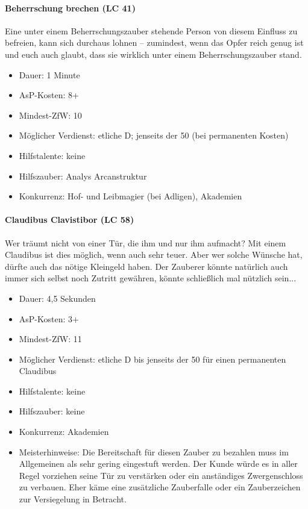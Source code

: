 \paragraph{Beherrschung brechen (LC 41)}
Eine unter einem Beherrschungszauber stehende Person von diesem Einfluss zu befreien, kann sich durchaus lohnen -- zumindest, wenn das Opfer reich genug ist und euch auch glaubt, dass sie wirklich unter einem Beherrschungszauber stand.
\begin{itemize}
	\item Dauer: 1 Minute
	\item AsP-Kosten: 8+
	\item Mindest-ZfW: 10
	\item Möglicher Verdienst: etliche D; jenseits der \SI{50}{\D} (bei permanenten Kosten)
	\item Hilfstalente: keine
	\item Hilfszauber: Analys Arcanstruktur
	\item Konkurrenz: Hof- und Leibmagier (bei Adligen), Akademien
\end{itemize}

\paragraph{Claudibus Clavistibor (LC 58)}
Wer träumt nicht von einer Tür, die ihm und nur ihm aufmacht? Mit einem Claudibus ist dies möglich, wenn auch sehr teuer. Aber wer solche Wünsche hat, dürfte auch das nötige Kleingeld haben. Der Zauberer könnte natürlich auch immer sich selbst noch Zutritt gewähren, könnte schließlich mal nützlich sein...
\begin{itemize}
	\item Dauer: 4,5 Sekunden
	\item AsP-Kosten: 3+
	\item Mindest-ZfW: 11
	\item Möglicher Verdienst: etliche D bis jenseits der \SI{50}{\D} für einen permanenten Claudibus
	\item Hilfstalente: keine
	\item Hilfszauber: keine
	\item Konkurrenz: Akademien
	\item Meisterhinweise: Die Bereitschaft für diesen Zauber zu bezahlen muss im Allgemeinen als sehr gering eingestuft werden. Der Kunde würde es in aller Regel vorziehen seine Tür zu verstärken oder ein anständiges Zwergenschloss zu verbauen. Eher käme eine zusätzliche Zauberfalle oder ein Zauberzeichen zur Versiegelung in Betracht.
\end{itemize}

